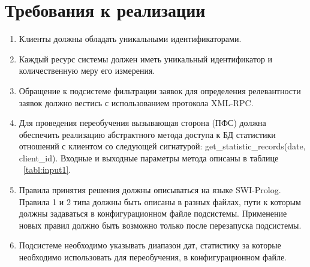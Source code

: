\documentclass[utf8x, 12pt]{G7-32}
\begin{document}
\section{Требования к реализации}

\begin{enumerate}
        \item Клиенты должны обладать уникальными идентификаторами.
        \item Каждый ресурс системы должен иметь уникальный идентификатор и
        количественную меру его измерения.
        \item Обращение к подсистеме фильтрации заявок для определения релевантности
        заявок должно вестись с использованием протокола XML-RPC.
        \item Для проведения переобучения вызывающая сторона (ПФС) должна обеспечить
        реализацию абстрактного метода доступа к БД статистики отношений с клиентом со
        следующей сигнатурой: get_statistic_records(date, client_id). Входные и выходные 
        параметры метода описаны в таблице ~\ref{tabl:input1}.
        \item Правила принятия решения должны описываться на языке SWI-Prolog. 
        Правила 1 и 2 типа должны быть описаны в разных файлах, пути к которым должны
        задаваться в конфигурационном файле подсистемы. Применение новых правил
        должно быть возможно только после перезапуска подсистемы.
        \item Подсистеме необходимо указывать диапазон дат, статистику за которые
        необходимо использовать для переобучения, в конфигурационном файле.
\end{enumerate}
\end{document}
